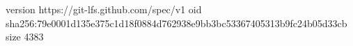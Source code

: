 version https://git-lfs.github.com/spec/v1
oid sha256:79e0001d135e375c1d18f0884d762938e9bb3bc53367405313b9fc24b05d33cb
size 4383
